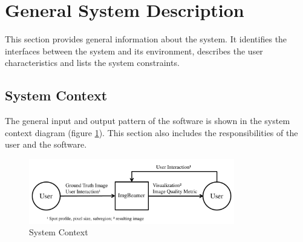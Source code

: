 \documentclass[12pt]{article}
\begin{document}
\section{General System Description}

This section provides general information about the system. It identifies the
interfaces between the system and its environment, describes the user
characteristics and lists the system constraints.

\subsection{System Context}

The general input and output pattern of the \progname{} software is shown in the 
system context diagram (figure \ref{Fig_SystemContext}). This section also 
includes the responsibilities of the user and the software.

\setlength{\belowcaptionskip}{-30pt}
\begin{figure}[h!]
\begin{center}
 \includegraphics[width=0.8\textwidth]{SystemContextFigure}
\caption{System Context}
\label{Fig_SystemContext} 
\end{center}
\end{figure}
\setlength{\belowcaptionskip}{10pt}
\end{document}
